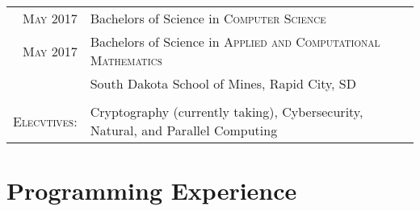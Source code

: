 \documentclass[10pt,a4paper]{article} %
\begin{document}
\begin{tabular}{rl}	
\textsc{May} 2017 & Bachelors of Science in \textsc{Computer Science} \\



\textsc{May} 2017 & Bachelors of Science in \textsc{Applied and Computational Mathematics} \\
& South Dakota School of Mines, Rapid City, SD\\
\\
\textsc{Elecvtives:} & Cryptography (currently taking), Cybersecurity,  Natural, and Parallel Computing \\
\end{tabular}




\section{Programming Experience}
\end{document}
